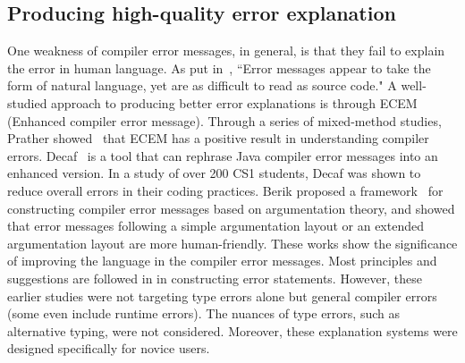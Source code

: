 \subsection{Producing high-quality error explanation}
One weakness of compiler error messages, in general, is that they fail to explain the error in human language. As put in~\cite{Barik2017-gy}, ``Error messages appear to take the form of natural language, yet are as difficult to read as source code."  A well-studied approach to producing better error explanations is through ECEM (Enhanced compiler error message). Through a series of mixed-method studies, Prather showed~\cite{Prather2017-dg} that ECEM has a positive result in understanding compiler errors. Decaf~\cite{Becker2016-kc} is a tool that can rephrase Java compiler error messages into an enhanced version. In a study of over 200 CS1 students, Decaf was shown to reduce overall errors in their coding practices. Berik proposed a framework~\cite{Barik2018-xs} for constructing compiler error messages based on argumentation theory, and showed that error messages following a simple argumentation layout or an extended argumentation layout are more human-friendly.  These works show the significance of improving the language in the compiler error messages. Most principles and suggestions are followed in \chameleon{} in constructing error statements. However, these earlier studies were not targeting type errors alone but general compiler errors (some even include runtime errors). The nuances of type errors, such as alternative typing, were not considered. Moreover, these explanation systems were designed specifically for novice users. 




